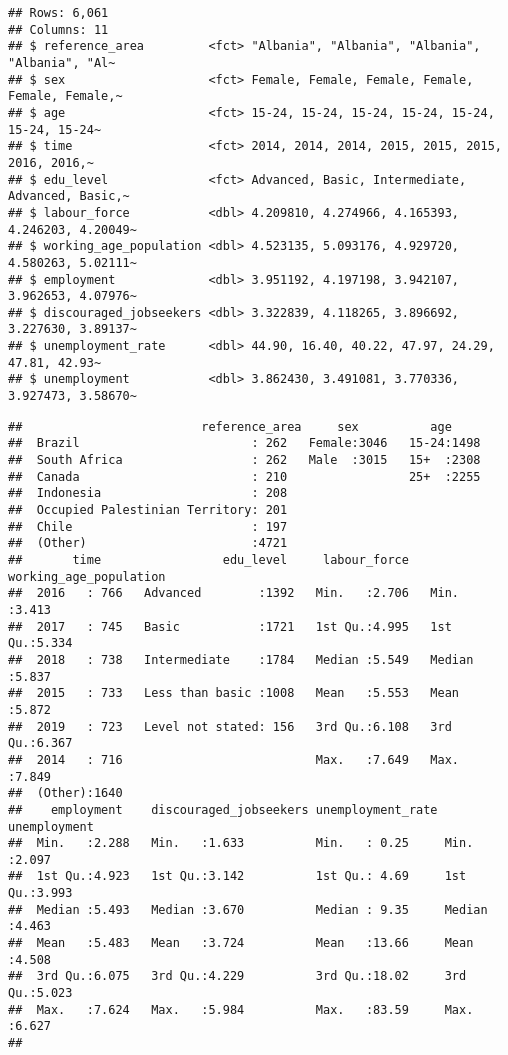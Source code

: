 \documentclass[
]{article}
\begin{document}
\begin{verbatim}
## Rows: 6,061
## Columns: 11
## $ reference_area         <fct> "Albania", "Albania", "Albania", "Albania", "Al~
## $ sex                    <fct> Female, Female, Female, Female, Female, Female,~
## $ age                    <fct> 15-24, 15-24, 15-24, 15-24, 15-24, 15-24, 15-24~
## $ time                   <fct> 2014, 2014, 2014, 2015, 2015, 2015, 2016, 2016,~
## $ edu_level              <fct> Advanced, Basic, Intermediate, Advanced, Basic,~
## $ labour_force           <dbl> 4.209810, 4.274966, 4.165393, 4.246203, 4.20049~
## $ working_age_population <dbl> 4.523135, 5.093176, 4.929720, 4.580263, 5.02111~
## $ employment             <dbl> 3.951192, 4.197198, 3.942107, 3.962653, 4.07976~
## $ discouraged_jobseekers <dbl> 3.322839, 4.118265, 3.896692, 3.227630, 3.89137~
## $ unemployment_rate      <dbl> 44.90, 16.40, 40.22, 47.97, 24.29, 47.81, 42.93~
## $ unemployment           <dbl> 3.862430, 3.491081, 3.770336, 3.927473, 3.58670~
\end{verbatim}

\begin{verbatim}
##                         reference_area     sex          age      
##  Brazil                        : 262   Female:3046   15-24:1498  
##  South Africa                  : 262   Male  :3015   15+  :2308  
##  Canada                        : 210                 25+  :2255  
##  Indonesia                     : 208                             
##  Occupied Palestinian Territory: 201                             
##  Chile                         : 197                             
##  (Other)                       :4721                             
##       time                 edu_level     labour_force   working_age_population
##  2016   : 766   Advanced        :1392   Min.   :2.706   Min.   :3.413         
##  2017   : 745   Basic           :1721   1st Qu.:4.995   1st Qu.:5.334         
##  2018   : 738   Intermediate    :1784   Median :5.549   Median :5.837         
##  2015   : 733   Less than basic :1008   Mean   :5.553   Mean   :5.872         
##  2019   : 723   Level not stated: 156   3rd Qu.:6.108   3rd Qu.:6.367         
##  2014   : 716                           Max.   :7.649   Max.   :7.849         
##  (Other):1640                                                                 
##    employment    discouraged_jobseekers unemployment_rate  unemployment  
##  Min.   :2.288   Min.   :1.633          Min.   : 0.25     Min.   :2.097  
##  1st Qu.:4.923   1st Qu.:3.142          1st Qu.: 4.69     1st Qu.:3.993  
##  Median :5.493   Median :3.670          Median : 9.35     Median :4.463  
##  Mean   :5.483   Mean   :3.724          Mean   :13.66     Mean   :4.508  
##  3rd Qu.:6.075   3rd Qu.:4.229          3rd Qu.:18.02     3rd Qu.:5.023  
##  Max.   :7.624   Max.   :5.984          Max.   :83.59     Max.   :6.627  
## 
\end{verbatim}
\end{document}
